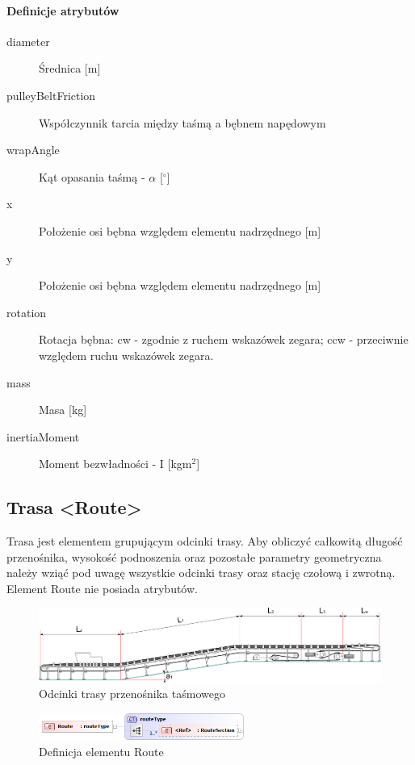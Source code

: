 \documentclass[12pt,a4paper]{article}
\begin{document}
\paragraph{Definicje atrybutów}
\begin{description}
\item[diameter] Średnica [m]
\item[pulleyBeltFriction] Współczynnik tarcia między taśmą a bębnem napędowym
\item[wrapAngle] Kąt opasania taśmą - $\alpha$ [$^\circ$]
\item[x] Położenie osi bębna względem elementu nadrzędnego [m]
\item[y] Położenie osi bębna względem elementu nadrzędnego [m]
\item[rotation] Rotacja bębna: cw - zgodnie z ruchem wskazówek zegara;
	ccw - przeciwnie względem ruchu wskazówek zegara.
\item[mass] Masa [kg]
\item[inertiaMoment] Moment bezwładności - I [kgm$^2$]
\end{description}

\subsection{Trasa <Route>}
Trasa jest elementem grupującym odcinki trasy. Aby obliczyć całkowitą długość
przenośnika, wysokość podnoszenia oraz pozostałe parametry geometryczna należy
wziąć pod uwagę wszystkie odcinki trasy oraz stację czołową i zwrotną. 
Element Route nie posiada atrybutów.

\begin{figure}
  \centering
  \includegraphics[width=\textwidth]{png/belt_conveyor2_drw}
  \caption{Odcinki trasy przenośnika taśmowego}
  \label{fig:beltConveyor2-drw}
\end{figure}

\begin{figure}[H]
  \centering
  \includegraphics[width=0.6\textwidth]{png/liquid/Route}
  \caption{Definicja elementu Route}
  \label{fig:route-xsd}
\end{figure}
\end{document}
